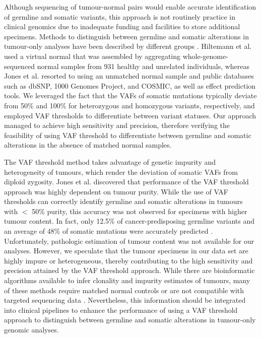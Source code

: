 Although sequencing of tumour-normal pairs would enable accurate identification of germline and somatic variants, this approach is not routinely practice in clinical genomics due to inadequate funding and facilities to store additional specimens. Methods to distinguish between germline and somatic alterations in tumour-only analyses have been described by different groups \cite{Hiltemann2015, Jones2015a, Garofalo2016}. Hiltemann et al. \cite{Hiltemann2015} used a virtual normal that was assembled by aggregating whole-genome-sequenced normal samples from 931 healthy and unrelated individuals, whereas Jones et al. \cite{Jones2015a} resorted to using an unmatched normal sample and public databases such as dbSNP, 1000 Genomes Project, and COSMIC, as well as effect prediction tools. We leveraged the fact that the VAFs of somatic mutations typically deviate from 50\% and 100\% for heterozygous and homozygous variants, respectively, and employed VAF thresholds to differentiate between variant statuses. Our approach managed to achieve high sensitivity and precision, therefore verifying the feasibility of using VAF threshold to differentiate between germline and somatic alterations in the absence of matched normal samples.

The VAF threshold method takes advantage of genetic impurity and heterogeneity of tumours, which render the deviation of somatic VAFs from diploid zygosity. Jones et al. \cite{Jones2015a} discovered that performance of the VAF threshold approach was highly dependent on tumour purity. While the use of VAF thresholds can correctly identify germline and somatic alterations in tumours with $<$ 50\% purity, this accuracy was not observed for specimens with higher tumour content. In fact, only 12.5\% of cancer-predisposing germline variants and an average of 48\% of somatic mutations were accurately predicted \cite{Jones2015a}. Unfortunately, pathologic estimation of tumour content was not available for our analyses. However, we speculate that the tumour specimens in our data set are highly impure or heterogeneous, thereby contributing to the high sensitivity and precision attained by the VAF threshold approach. While there are bioinformatic algorithms available to infer clonality and impurity estimates of tumours, many of these methods require matched normal controls or are not compatible with targeted sequencing data \cite{Yadav2015}. Nevertheless, this information should be integrated into clinical pipelines to enhance the performance of using a VAF threshold approach to distinguish between germline and somatic alterations in tumour-only genomic analyses.

